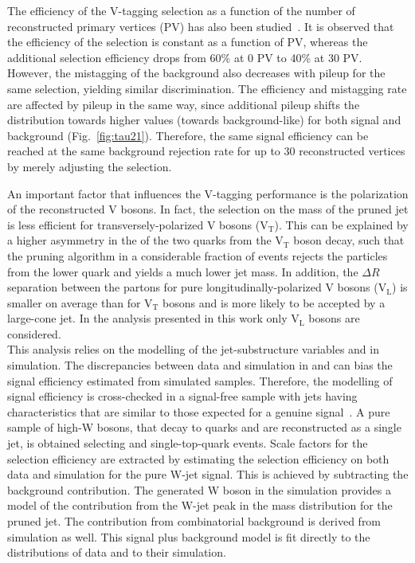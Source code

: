 The efficiency of the V-tagging selection as a function of the number of reconstructed primary vertices (PV) has also been studied~\cite{JME-16-003}. It is observed that the efficiency of the \mJ selection is constant as a function of PV, whereas the additional \nsubj selection efficiency drops from 60\% at 0 PV to 40\% at 30 PV. However, the mistagging of the background also decreases with pileup for the same selection, yielding similar discrimination. The efficiency and mistagging rate are affected by pileup in the same way, since additional pileup shifts the \nsubj distribution towards higher values (towards background-like) for both signal and background (Fig.~\ref{fig:tau21}). Therefore, the same signal efficiency can be reached at the same background rejection rate for up to 30 reconstructed vertices by merely adjusting the \nsubj selection.

An important factor that influences the V-tagging performance is the polarization of the reconstructed V bosons. In fact, the selection on the mass of the pruned jet is less efficient for transversely-polarized V bosons (V$_\mathrm{T}$). This can be explained by a higher asymmetry in the \pt of the two quarks from the V$_\mathrm{T}$ boson decay, such that the pruning algorithm in a considerable fraction of events rejects the particles from the lower \pt quark and yields a much lower jet mass. In addition, the $\Delta R$ separation between the partons for pure longitudinally-polarized V bosons (V$_\mathrm{L}$) is smaller on average than for V$_\mathrm{T}$ bosons and is more likely to be accepted by a large-cone jet. In the analysis presented in this work only V$_\mathrm{L}$  bosons are considered.\\

This analysis relies on the modelling of the jet-substructure variables \mJ and \nsubj in simulation. The discrepancies between data and simulation in \mJ and \nsubj can bias the signal efficiency estimated from simulated samples. Therefore, the modelling of signal efficiency is cross-checked in a signal-free sample with jets having characteristics that are similar to those expected for a genuine signal~\cite{JME-16-003}. A pure sample of high-\pt W bosons, that decay to quarks and are reconstructed as a single jet, is obtained selecting \ttbar and single-top-quark events.
Scale factors for the \nsubj selection efficiency are extracted by estimating the selection efficiency on both data and simulation for the pure W-jet signal. This is achieved by subtracting the background contribution.
The generated W boson in the \ttbar simulation provides a model of the contribution from the W-jet peak in the mass distribution for the pruned jet. The contribution from combinatorial background is derived from \ttbar simulation as well. This signal plus background model is fit directly to the distributions of data and to their simulation.

